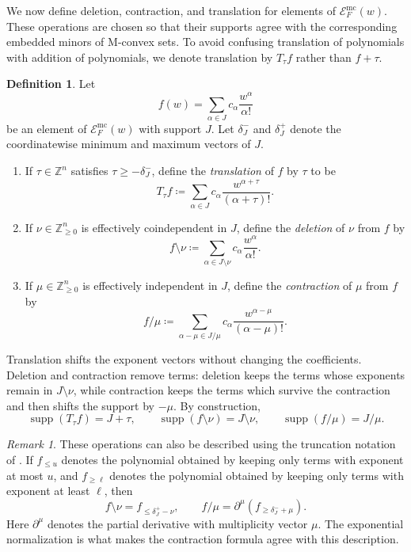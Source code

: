 \documentclass[11pt]{article}
\theoremstyle{definition}
\newtheorem{definition}[theorem]{Definition}
\theoremstyle{remark}
\newtheorem{remark}[theorem]{Remark}
\newcommand{\Zgeqn}{\mathbb{Z}_{\geq 0}^n}     %
\newcommand{\delplus}{\delta_J^+}
\newcommand{\delminus}{\delta_J^-}
\DeclareMathOperator{\supp}{supp}
\begin{document}
We now define deletion, contraction, and translation for elements of $\mathcal{E}^{\mathrm{mc}}_F(w)$. These operations are chosen so that their supports agree with the corresponding embedded minors of M-convex sets. To avoid confusing translation of polynomials with addition of polynomials, we denote translation by $T_\tau f$ rather than $f+\tau$.

\begin{definition}\label{def:embedded_minor_gen_poly}
    Let
    \[
        f(w)=\sum_{\alpha\in J} c_\alpha \frac{w^\alpha}{\alpha!}
    \]
    be an element of $\mathcal{E}^{\mathrm{mc}}_F(w)$ with support $J$. Let $\delminus$ and $\delplus$ denote the coordinatewise minimum and maximum vectors of $J$.

    \begin{enumerate}
        \item If $\tau\in\mathbb{Z}^n$ satisfies $\tau\geq -\delminus$, define the \emph{translation} of $f$ by $\tau$ to be
        \[
            T_\tau f
            \coloneqq
            \sum_{\alpha\in J}
            c_\alpha
            \frac{w^{\alpha+\tau}}{(\alpha+\tau)!}.
        \]

        \item If $\nu\in\Zgeqn$ is effectively coindependent in $J$, define the \emph{deletion} of $\nu$ from $f$ by
        \[
            f\setminus \nu
            \coloneqq
            \sum_{\alpha\in J\setminus \nu}
            c_\alpha
            \frac{w^\alpha}{\alpha!}.
        \]

        \item If $\mu\in\Zgeqn$ is effectively independent in $J$, define the \emph{contraction} of $\mu$ from $f$ by
        \[
            f/\mu
            \coloneqq
            \sum_{\alpha-\mu\in J/\mu}
            c_\alpha
            \frac{w^{\alpha-\mu}}{(\alpha-\mu)!}.
        \]
    \end{enumerate}
\end{definition}

Translation shifts the exponent vectors without changing the coefficients. Deletion and contraction remove terms: deletion keeps the terms whose exponents remain in $J\setminus\nu$, while contraction keeps the terms which survive the contraction and then shifts the support by $-\mu$. By construction,
\[
    \supp(T_\tau f)=J+\tau,
    \qquad
    \supp(f\setminus\nu)=J\setminus\nu,
    \qquad
    \supp(f/\mu)=J/\mu.
\]

\begin{remark}\label{remark:deletion_contraction_match_truncation}
    These operations can also be described using the truncation notation of \cite{ross2023duallylorentzianpolynomials}. If $f_{\leq u}$ denotes the polynomial obtained by keeping only terms with exponent at most $u$, and $f_{\geq \ell}$ denotes the polynomial obtained by keeping only terms with exponent at least $\ell$, then
    \[
        f\setminus\nu = f_{\leq \delplus - \nu},
        \qquad
        f/\mu = \partial^\mu\left(f_{\geq \delminus+\mu}\right).
    \]
    Here $\partial^\mu$ denotes the partial derivative with multiplicity vector $\mu$. The exponential normalization is what makes the contraction formula agree with this description.
\end{remark}
\end{document}
